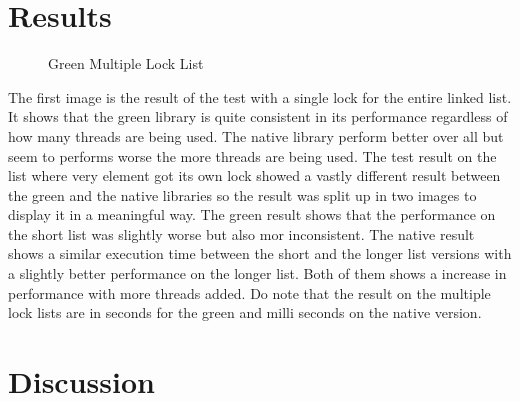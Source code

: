 \documentclass{article}
\begin{document}
\section{Results}\label{results}


\begin{figure}
\hspace{4em}
\caption{Green Multiple Lock List}
\end{figure}
The first image is the result of the test with a single lock for the entire linked list. It shows that the green library is quite consistent in its performance regardless of how many threads are being used. The native library perform better over all but seem to performs worse the more threads are being used. 
The test result on the list where very element got its own lock showed a vastly different result between the green and the native libraries so the result was split up in two images to display it in a meaningful way. The green result shows that the performance on the short list was slightly worse but also mor inconsistent.
The native result shows a similar execution time between the short and the longer list versions with a slightly better performance on the longer list. Both of them shows a increase in performance with more threads added. Do note that the result on the multiple lock lists are in seconds for the green and milli seconds on the native version.



\section{Discussion}\label{discussion}
\end{document}
